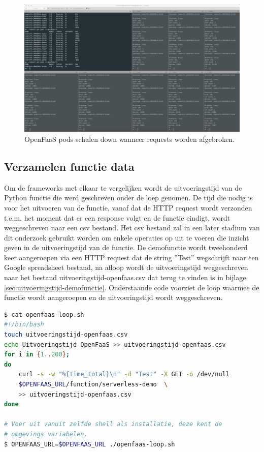 \begin{figure}
    \includegraphics[width=1\textwidth]{img/openfaas-scalability-3.png}
    \caption{OpenFaaS pods schalen down wanneer requests worden afgebroken.}
    \label{fig:openfaas-scalability-3}  
\end{figure}

\subsection{Verzamelen functie data}
Om de frameworks met elkaar te vergelijken wordt de uitvoeringstijd van de Python functie die werd geschreven onder de loep genomen. De tijd die nodig is voor het uitvoeren van de functie, vanaf dat de HTTP request wordt verzonden t.e.m. het moment dat er een response volgt en de functie eindigt, wordt weggeschreven naar een csv bestand. Het csv bestand zal in een later stadium van dit onderzoek gebruikt worden om enkele operaties op uit te voeren die inzicht geven in de uitvoeringstijd van de functie. De demofunctie wordt tweehonderd keer aangeroepen via een HTTP request dat de string ''Test'' wegschrijft naar een Google spreadsheet bestand, na afloop wordt de uitvoeringstijd weggeschreven naar het bestand uitvoeringstijd-openfaas.csv dat terug te vinden is in bijlage \ref{sec:uitvoeringstijd-demofunctie}. Onderstaande code voorziet de loop waarmee de functie wordt aangeroepen en de uitvoeringstijd wordt weggeschreven. 

\begin{lstlisting}[language=bash]
$ cat openfaas-loop.sh
#!/bin/bash
touch uitvoeringstijd-openfaas.csv
echo Uitvoeringstijd OpenFaaS >> uitvoeringstijd-openfaas.csv
for i in {1..200};
do
    curl -s -w "%{time_total}\n" -d "Test" -X GET -o /dev/null
    $OPENFAAS_URL/function/serverless-demo  \
    >> uitvoeringstijd-openfaas.csv
done

# Voer uit vanuit zelfde shell als installatie, deze kent de 
# omgevings variabelen.
$ OPENFAAS_URL=$OPENFAAS_URL ./openfaas-loop.sh
\end{lstlisting}

